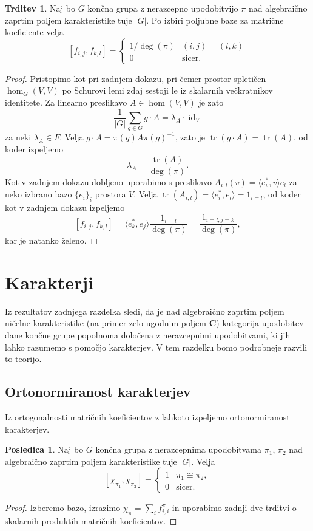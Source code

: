 \documentclass[11pt]{book}
\def\CC{\mathbf{C}}
\DeclareMathOperator\tr{tr}
\DeclareMathOperator\id{id}
\theoremstyle{definition}
\theoremstyle{zgled}
\theoremstyle{zgledbrezstevilke}
\theoremstyle{odprtproblem}
\theoremstyle{domacanaloga}
\newenvironment{dokaz}
    {\color{siva}\begin{proof}}
    {\end{proof}}
\theoremstyle{izrek}
\newtheorem{trditev}[theorem]{Trditev}
\newtheorem{posledica}[theorem]{Posledica}
\begin{document}
\begin{trditev}
Naj bo $G$ končna grupa z nerazcepno upodobitvijo $\pi$ nad algebraično zaprtim poljem karakteristike tuje $|G|$. Po izbiri poljubne baze za matrične koeficiente velja
\[
    [ f_{i,j}, f_{k,l} ] = 
    \begin{cases}
        1/\deg(\pi) & (i,j) = (l,k) \\
        0 & \text{sicer.}
    \end{cases}
\]
\end{trditev}
\begin{dokaz}
Pristopimo kot pri zadnjem dokazu, pri čemer prostor spletičen $\hom_G(V,V)$ po Schurovi lemi zdaj sestoji le iz skalarnih večkratnikov identitete. Za linearno preslikavo $A \in \hom(V,V)$ je zato
\[
    \frac{1}{|G|} \sum_{g \in G} g \cdot A = \textstyle \lambda_A \cdot \id_V
\]
za neki $\lambda_A \in F$. Velja $g \cdot A = \pi(g) A \pi(g)^{-1}
$, zato je $\tr(g \cdot A) = \tr(A)$, od koder izpeljemo
\[
    \lambda_A = \frac{\tr(A)}{\deg(\pi)}.
\]
Kot v zadnjem dokazu dobljeno uporabimo s preslikavo $A_{i,l}(v) = \langle e_i^*, v \rangle e_l$ za neko izbrano bazo $\{ e_i \}_i$ prostora $V$. Velja $\tr(A_{i,l}) = \langle e_i^*, e_l \rangle = 1_{i = l}$, od koder kot v zadnjem dokazu izpeljemo
\[
    [ f_{i,j}, f_{k,l} ] = \langle e_k^*, e_j \rangle \frac{1_{i = l}}{\deg(\pi)} = \frac{1_{i = l, j = k}}{\deg(\pi)},
\]
kar je natanko želeno.
\end{dokaz}

\section{Karakterji}

Iz rezultatov zadnjega razdelka sledi, da je nad algebraično zaprtim poljem ničelne karakteristike (na primer zelo ugodnim poljem $\CC$) kategorija upodobitev dane končne grupe popolnoma določena z nerazcepnimi upodobitvami, ki jih lahko razumemo s pomočjo karakterjev. V tem razdelku bomo podrobneje razvili to teorijo.

\subsection{Ortonormiranost karakterjev}

Iz ortogonalnosti matričnih koeficientov z lahkoto izpeljemo ortonormiranost karakterjev.

\begin{posledica}
Naj bo $G$ končna grupa z nerazcepnima upodobitvama $\pi_1$, $\pi_2$ nad algebraično zaprtim poljem karakteristike tuje $|G|$. Velja
\[
    [ \chi_{\pi_1}, \chi_{\pi_2} ] =
    \begin{cases}
        1 & \pi_1 \cong \pi_2, \\
        0 & \text{sicer.}
    \end{cases}
\]
\end{posledica}
\begin{dokaz}
Izberemo bazo, izrazimo $\chi_{\pi} = \sum_i f_{i,i}^{\pi}$ in uporabimo zadnji dve trditvi o skalarnih produktih matričnih koeficientov.
\end{dokaz}
\end{document}
